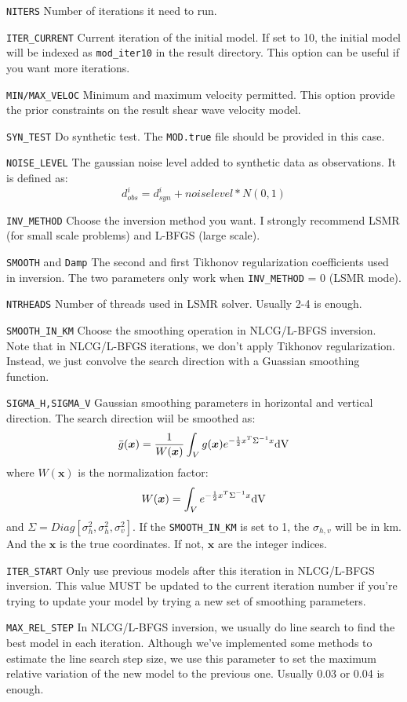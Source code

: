 \documentclass[UTF8]{article}
\begin{document}
\begin{description}
\item \texttt{NITERS} Number of iterations it need to run.
\item \texttt{ITER\_CURRENT} Current iteration of the initial model. If set to 10, the initial model will be indexed as \texttt{mod\_iter10} in the result directory. This option can be useful if you want more iterations.
\item \texttt{MIN/MAX\_VELOC} Minimum and maximum velocity permitted. This option provide the prior constraints on the result shear wave velocity model.
\item \texttt{SYN\_TEST} Do synthetic test. The \texttt{MOD.true} file should be provided in this case.
\item \texttt{NOISE\_LEVEL} The gaussian noise level added to synthetic data as observations. It is defined as:
\[   
    d_{obs}^i = d_{syn}^i +  noiselevel * N(0,1)
\]
\item \texttt{INV\_METHOD} Choose the inversion method you want. I strongly recommend LSMR (for small scale problems) and L-BFGS (large scale).
\item \texttt{SMOOTH} and \texttt{Damp} The second and first Tikhonov regularization coefficients used in inversion. The two parameters only work when \texttt{INV\_METHOD} = 0 (LSMR mode).
\item \texttt{NTRHEADS} Number of threads used in LSMR solver. Usually 2-4 is enough.
\item \texttt{SMOOTH\_IN\_KM} Choose the smoothing operation in NLCG/L-BFGS inversion. Note that in NLCG/L-BFGS iterations, we don't apply Tikhonov regularization. Instead, we just convolve the search direction with a Guassian smoothing function.
\item \texttt{SIGMA\_H,SIGMA\_V} Gaussian smoothing parameters in horizontal and vertical direction.  The search direction wiil be smoothed as:
\[
\bar{g}(\bm{x}) = \frac{1}{W(\bm{x})} \int_V g(\bm{x}) e^{- \frac{1}{2} x^T \Sigma^{-1} x} \rm{d}V
\]
where $W(\bm{x})$ is the normalization factor: 
\[
W(\bm{x}) = \int_V e^{-\frac{1}{2} x^T \Sigma^{-1} x} \rm{d}V
\]
and $\Sigma = Diag\left[\sigma_h^2,\sigma_h^2,\sigma_v^2  \right]$. If the \texttt{SMOOTH\_IN\_KM} is set to 1, the $\sigma_{h,v}$ will be in km. And the $\bm{x}$ is the true coordinates. If not, $\bm{x}$ are the integer indices.
\item \texttt{ITER\_START} Only use previous models after this iteration in NLCG/L-BFGS inversion. This value MUST be updated to the current iteration number if you're trying to update your model by trying a new set of smoothing parameters.
\item \texttt{MAX\_REL\_STEP} In NLCG/L-BFGS inversion, we usually do line search to find the best model in each iteration. Although we've implemented some methods to estimate the line search step size, we use this parameter to set the maximum relative variation of the new model to the previous one. Usually 0.03 or 0.04 is enough.
\end{description}
\end{document}
